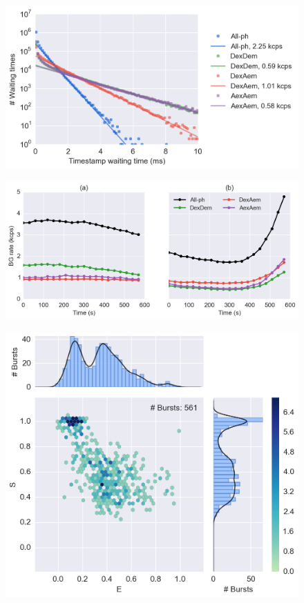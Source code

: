 \begin{figure}
\begin{center}
\includegraphics[width=0.8\columnwidth]{"figures/ph_delays_distrib_all/ph_delays_distrib_all"}
\caption[]{}
\end{center}
\end{figure}

\begin{figure}
\begin{center}
\includegraphics[width=\textwidth]{"figures/background_timetrace/background_timetrace"}
\caption[]{}
\end{center}
\end{figure}





\begin{figure}
\begin{center}
\includegraphics[width=0.7\columnwidth]{"figures/alex_jointplot/alex_jointplot"}
\caption[]{}
\end{center}
\end{figure}










